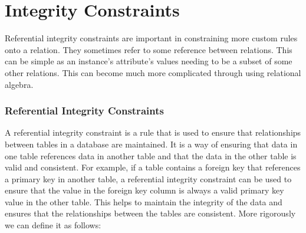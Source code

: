 \documentclass{report}
\begin{document}
         









     \section{Integrity Constraints}
     \par Referential integrity constraints are important in constraining more custom rules onto a relation. They sometimes refer to some reference between relations. This can be simple as an instance's attribute's values needing to be a subset of some other relations. This can become much more complicated through using relational algebra.

     \subsubsection{Referential Integrity Constraints}
     \hspace{.5cm} A referential integrity constraint is a rule that is used to ensure that relationships between tables in a database are maintained. It is a way of ensuring that data in one table references data in another table and that the data in the other table is valid and consistent. For example, if a table contains a foreign key that references a primary key in another table, a referential integrity constraint can be used to ensure that the value in the foreign key column is always a valid primary key value in the other table. This helps to maintain the integrity of the data and ensures that the relationships between the tables are consistent. More rigorously we can define it as follows:
\end{document}
